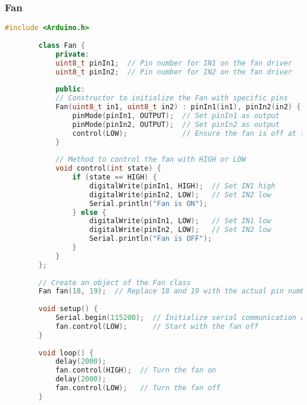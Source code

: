 	\subsubsection*{Fan}
	\begin{lstlisting}[language=C++]
		#include <Arduino.h>
		
		class Fan {
			private:
			uint8_t pinIn1;  // Pin number for IN1 on the fan driver
			uint8_t pinIn2;  // Pin number for IN2 on the fan driver
			
			public:
			// Constructor to initialize the Fan with specific pins
			Fan(uint8_t in1, uint8_t in2) : pinIn1(in1), pinIn2(in2) {
				pinMode(pinIn1, OUTPUT);  // Set pinIn1 as output
				pinMode(pinIn2, OUTPUT);  // Set pinIn2 as output
				control(LOW);             // Ensure the fan is off at the start
			}
			
			// Method to control the fan with HIGH or LOW
			void control(int state) {
				if (state == HIGH) {
					digitalWrite(pinIn1, HIGH);  // Set IN1 high
					digitalWrite(pinIn2, LOW);   // Set IN2 low
					Serial.println("Fan is ON");
				} else {
					digitalWrite(pinIn1, LOW);   // Set IN1 low
					digitalWrite(pinIn2, LOW);   // Set IN2 low
					Serial.println("Fan is OFF");
				}
			}
		};
		
		// Create an object of the Fan class
		Fan fan(18, 19);  // Replace 18 and 19 with the actual pin numbers if necessary
		
		void setup() {
			Serial.begin(115200);  // Initialize serial communication at 115200 baud rate
			fan.control(LOW);      // Start with the fan off
		}
		
		void loop() {
			delay(2000);
			fan.control(HIGH);  // Turn the fan on
			delay(2000);
			fan.control(LOW);   // Turn the fan off
		}
	\end{lstlisting}
	
